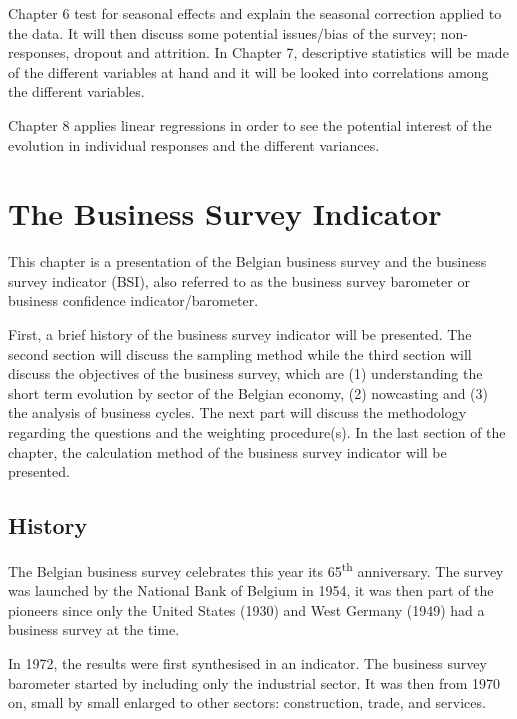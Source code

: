 \documentclass[12pt,a4paper,oneside]{book}
\begin{document}
Chapter 6 test for seasonal effects and explain the seasonal correction applied to the data. It will then discuss some potential issues/bias of the survey; non-responses, dropout and attrition.
In Chapter 7, descriptive statistics will be made of the different variables at hand and it will be looked into correlations among the different variables.

Chapter 8 applies linear regressions in order to see the potential interest of the evolution in individual responses and the different variances.



\chapter{The Business Survey Indicator}

This chapter is a presentation of the Belgian business survey and the business survey indicator (BSI), also referred to as the business survey barometer or business confidence indicator/barometer.

First, a brief history of the business survey indicator will be presented.
The second section will discuss the sampling method while the third section will discuss the objectives of the business survey, which are (1) understanding the short term evolution by sector of the Belgian economy, (2) nowcasting and (3) the analysis of business cycles.
The next part will discuss the methodology regarding the questions and the weighting procedure(s).
In the last section of the chapter, the calculation method of the business survey indicator will be presented.


\section{History}

The Belgian business survey celebrates this year its 65\textsuperscript{th} anniversary. The survey was launched by the National Bank of Belgium in 1954, it was then part of the pioneers since only the United States (1930) and West Germany (1949) had a business survey at the time.

In 1972, the results were first synthesised in an indicator.
The business survey barometer started by including only the industrial sector. It was then from 1970 on, small by small enlarged to other sectors: construction, trade, and services. 
\end{document}
